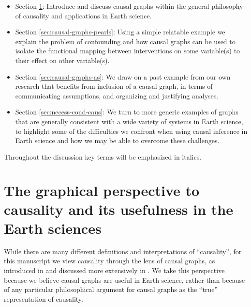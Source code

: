 \documentclass[12pt]{article}
\begin{document}
\begin{itemize}
\item Section \ref{sec:what-caus-caus}: Introduce and discuss causal
  graphs within the general philosophy of causality and applications
  in Earth science.
\item Section \ref{sec:causal-graphs-pearls}: Using a simple relatable
  example we explain the problem of confounding and how causal graphs
  can be used to isolate the functional mapping between interventions
  on some variable(s) to their effect on other variable(s).
\item Section \ref{sec:causal-graphs-as}: We draw on a past example
  from our own research that benefits from inclusion of a causal
  graph, in terms of communicating assumptions, and organizing and
  justifying analyses.
\item Section \ref{sec:necess-cond-caus}: We turn to more generic
  examples of graphs that are generally consistent with a wide variety
  of systems in Earth science, to highlight some of the difficulties
  we confront when using causal inference in Earth science and how we
  may be able to overcome these challenges.
\end{itemize}

Throughout the discussion key terms will be emphasized in italics.

\section{The graphical
  perspective to causality and its usefulness in the Earth
  sciences}\label{sec:what-caus-caus}

While there are many different definitions and interpretations of
``causality'', for this manuscript we view causality through the lens
of causal graphs, as introduced in \citet{pearl1995causal} and
discussed more extensively in \citet{pearl2009causality}. We take this
perspective because we believe causal graphs are useful in Earth
science, rather than because of any particular philosophical argument
for causal graphs as the ``true'' representation of causality.
\end{document}
